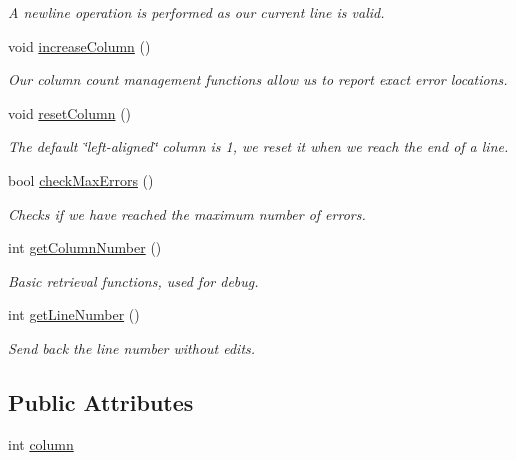 \begin{DoxyCompactItemize}
\begin{DoxyCompactList}\small\item\em A newline operation is performed as our current line is valid. \item\end{DoxyCompactList}\item 
void \hyperlink{classAdmin_a89653dd68c51b51d9003a2518a56175f}{increaseColumn} ()
\begin{DoxyCompactList}\small\item\em Our column count management functions allow us to report exact error locations. \item\end{DoxyCompactList}\item 
void \hyperlink{classAdmin_a62813e5c17636eeef43524ad40cdaab8}{resetColumn} ()
\begin{DoxyCompactList}\small\item\em The default \char`\"{}left-\/aligned\char`\"{} column is 1, we reset it when we reach the end of a line. \item\end{DoxyCompactList}\item 
bool \hyperlink{classAdmin_af5cd211ee7891ec1fec719bace4b678b}{checkMaxErrors} ()
\begin{DoxyCompactList}\small\item\em Checks if we have reached the maximum number of errors. \item\end{DoxyCompactList}\item 
int \hyperlink{classAdmin_a576e2dfe10f528ad5f1816e673ed2e32}{getColumnNumber} ()
\begin{DoxyCompactList}\small\item\em Basic retrieval functions, used for debug. \item\end{DoxyCompactList}\item 
int \hyperlink{classAdmin_a1a33282a2d64fa3dd9b3e8ac1a4799e3}{getLineNumber} ()
\begin{DoxyCompactList}\small\item\em Send back the line number without edits. \item\end{DoxyCompactList}\end{DoxyCompactItemize}
\subsection*{Public Attributes}
\begin{DoxyCompactItemize}
\item 
int \hyperlink{classAdmin_ae6bcb0d3aa08b938197a332c5af5a456}{column}
\end{DoxyCompactItemize}
